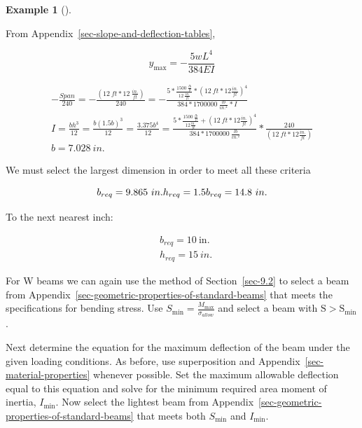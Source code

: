 \documentclass[
  letterpaper,
  DIV=11,
  numbers=noendperiod]{scrreprt}
\theoremstyle{definition}
\newtheorem{example}{Example}[chapter]
\theoremstyle{remark}
\begin{document}
\begin{tcolorbox}
\begin{example}[]
\begin{tcolorbox}
From Appendix~\ref{sec-slope-and-deflection-tables},

\[
y_{\max }=- \frac{5 w L^4}{384 E I}
\]

\[
\begin{gathered}
-\frac{Span}{240}=-\frac{(12{~ft}*12~\frac{in.}{ft})}{240}=-\frac{5*\frac{1500~\frac{lb}{ft}}{12~\frac{in.}{ft}}*(12{~ft}*12\frac{in.}{ft})^4}{384*1700000~\frac{lb}{in.^2}*I} \\
I=\frac{bh^3}{12}=\frac{b(1.5b)^3}{12}=\frac{3.375b^4}{12}=\frac{5*\frac{1500~\frac{lb}{ft}}{12\frac{in.}{ft}}+(12{~ft}*12\frac{in.}{ft})^4}{384*1700000~\frac{lb}{in.^2}}*\frac{240}{\left(12{~ft}*12\frac{in.}{ft}\right)}
\\ b=7.028{~in.}
\end{gathered}
\]

We must select the largest dimension in order to meet all these criteria

\[
b_{req}=9.865{~in.} \\ 
h_{req}=1.5b_{req}=14.8{~in.}
\]

To the next nearest inch:

\[
\begin{aligned} & b_{req}=10 \mathrm{~in.} \\ & h_{req}=15{~in.}\end{aligned}
\]

\end{tcolorbox}

\end{example}

\end{tcolorbox}

For W beams we can again use the method of Section~\ref{sec-9.2} to
select a beam from
Appendix~\ref{sec-geometric-properties-of-standard-beams} that meets the
specifications for bending stress. Use
\(S_{\min }=\frac{M_{\max }}{\sigma_{allow}}\) and select a beam with
\(\mathrm{S}>\mathrm{S}_{\min }\).

Next determine the equation for the maximum deflection of the beam under
the given loading conditions. As before, use superposition and
Appendix~\ref{sec-material-properties} whenever possible. Set the
maximum allowable deflection equal to this equation and solve for the
minimum required area moment of inertia, \(I_{\min }\). Now select the
lightest beam from
Appendix~\ref{sec-geometric-properties-of-standard-beams} that meets
both \(S_{\min }\) and \(I_{\min }\).
\end{document}
